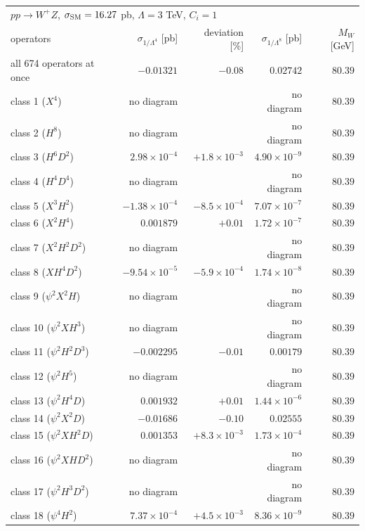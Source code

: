 \begin{table}[t]\centering\footnotesize\setlength{\tabcolsep}{4pt}
\begin{tabular}{@{}lrrrr@{}}\hline
\multicolumn{5}{l}{$p p \to W^+ Z$, $\sigma_{\rm SM} = 16.27$ pb, $\Lambda = 3$ TeV, $C_i = 1$}\\
operators & $\sigma_{1/\Lambda^4}$ [pb] & deviation [\%] & $\sigma_{1/\Lambda^8}$ [pb] & $M_W$ [GeV]\\\hline
all 674 operators at once & $-0.01321$ & $-0.08$ & $0.02742$ & $80.39$\\
class 1 ($X^4$) & no diagram &  & no diagram & $80.39$\\
class 2 ($H^8$) & no diagram &  & no diagram & $80.39$\\
class 3 ($H^6 D^2$) & $2.98\times 10^{-4}$ & $+1.8\times 10^{-3}$ & $4.90\times 10^{-9}$ & $80.39$\\
class 4 ($H^4 D^4$) & no diagram &  & no diagram & $80.39$\\
class 5 ($X^3 H^2$) & $-1.38\times 10^{-4}$ & $-8.5\times 10^{-4}$ & $7.07\times 10^{-7}$ & $80.39$\\
class 6 ($X^2 H^4$) & $0.001879$ & $+0.01$ & $1.72\times 10^{-7}$ & $80.39$\\
class 7 ($X^2 H^2 D^2$) & no diagram &  & no diagram & $80.39$\\
class 8 ($X H^4 D^2$) & $-9.54\times 10^{-5}$ & $-5.9\times 10^{-4}$ & $1.74\times 10^{-8}$ & $80.39$\\
class 9 ($\psi^2 X^2 H$) & no diagram &  & no diagram & $80.39$\\
class 10 ($\psi^2 X H^3$) & no diagram &  & no diagram & $80.39$\\
class 11 ($\psi^2 H^2 D^3$) & $-0.002295$ & $-0.01$ & $0.00179$ & $80.39$\\
class 12 ($\psi^2 H^5$) & no diagram &  & no diagram & $80.39$\\
class 13 ($\psi^2 H^4 D$) & $0.001932$ & $+0.01$ & $1.44\times 10^{-6}$ & $80.39$\\
class 14 ($\psi^2 X^2 D$) & $-0.01686$ & $-0.10$ & $0.02555$ & $80.39$\\
class 15 ($\psi^2 X H^2 D$) & $0.001353$ & $+8.3\times 10^{-3}$ & $1.73\times 10^{-4}$ & $80.39$\\
class 16 ($\psi^2 X H D^2$) & no diagram &  & no diagram & $80.39$\\
class 17 ($\psi^2 H^3 D^2$) & no diagram &  & no diagram & $80.39$\\
class 18 ($\psi^4 H^2$) & $7.37\times 10^{-4}$ & $+4.5\times 10^{-3}$ & $8.36\times 10^{-9}$ & $80.39$\\

\end{tabular}
\end{table}
